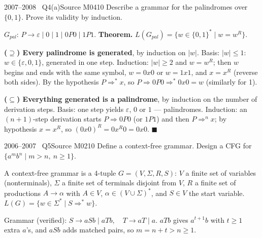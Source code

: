 \documentclass[11pt,a4paper]{article}
\newcommand{\eps}{\varepsilon}
\begin{document}
\begin{question}{2007--2008 \textbullet\ Q4(a)}{Source M04}{10}
Describe a grammar for the palindromes over $\{0,1\}$. Prove its validity by induction.
\end{question}
\begin{solution}
$G_{pal}$: $P\to\eps\mid0\mid1\mid0P0\mid1P1$. \textbf{Theorem.} $L(G_{pal})=\{w\in\{0,1\}^*\mid w=w^R\}$.

\textbf{($\supseteq$) Every palindrome is generated}, by induction on $|w|$. Basis: $|w|\le1$: $w\in\{\eps,0,1\}$, generated in one step. Induction: $|w|\ge2$ and $w=w^R$; then $w$ begins and ends with the same symbol, $w=0x0$ or $w=1x1$, and $x=x^R$ (reverse both sides). By the hypothesis $P\Rightarrow^*x$, so $P\Rightarrow0P0\Rightarrow^*0x0=w$ (similarly for 1).

\textbf{($\subseteq$) Everything generated is a palindrome}, by induction on the number of derivation steps. Basis: one step yields $\eps$, $0$ or $1$ --- palindromes. Induction: an $(n+1)$-step derivation starts $P\Rightarrow0P0$ (or $1P1$) and then $P\Rightarrow^nx$; by hypothesis $x=x^R$, so $(0x0)^R=0x^R0=0x0$. \hfill$\blacksquare$
\end{solution}

\begin{question}{2006--2007 \textbullet\ Q5}{Source M02}{10}
Define a context-free grammar. Design a CFG for $\{a^mb^n\mid m>n,\ n\ge1\}$.
\end{question}
\begin{solution}
A context-free grammar is a 4-tuple $G=(V,\Sigma,R,S)$: $V$ a finite set of variables (nonterminals), $\Sigma$ a finite set of terminals disjoint from $V$, $R$ a finite set of productions $A\to\alpha$ with $A\in V$, $\alpha\in(V\cup\Sigma)^*$, and $S\in V$ the start variable. $L(G)=\{w\in\Sigma^*\mid S\Rightarrow^*w\}$.

Grammar (verified): $S\to aSb\mid aTb,\quad T\to aT\mid a$.
$aTb$ gives $a^{t+1}b$ with $t\ge1$ extra $a$'s, and $aSb$ adds matched pairs, so $m=n+t>n\ge1$.
\end{solution}
\end{document}
